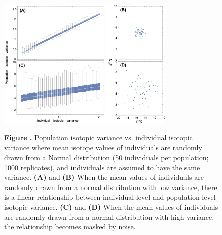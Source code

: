\documentclass{article}
\begin{document}
\begin{figure}[h!]
\begin{center}
\includegraphics[width=0.75\textwidth]{fig_indpopvar2.jpg}
\end{center}
\textbf{\label{figindpopvar} Figure .}{
Population isotopic variance vs. individual isotopic variance where mean isotope values of individuals are randomly drawn from a Normal distribution (50 individuals per population; 1000 replicates), and individuals are assumed to have the same variance.
{\bf(A)} and {\bf(B)} When the mean values of individuals are randomly drawn from a normal distribution with low variance, there is a linear relationship between individual-level and population-level isotopic variance.
{\bf(C)} and {\bf(D)} When the mean values of individuals are randomly drawn from a normal distribution with high variance, the relationship becomes masked by noise.
}
\end{figure}
\end{document}

